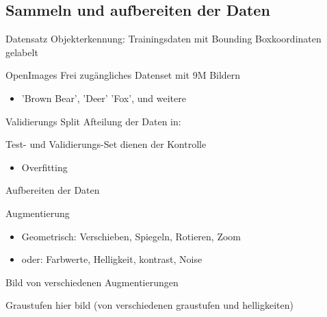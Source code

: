 \subsection[\thesection .\thesubsection \ 
Sammeln und aufbereiten der Daten]{Sammeln und aufbereiten der Daten}\label{subsec:collect_data}
\begin{frame}{Datensatz}
    Objekterkennung: Trainingsdaten mit Bounding Boxkoordinaten gelabelt
    \begin{block}{OpenImages}
        Frei zugängliches Datenset mit 9M Bildern
        \begin{itemize}
            \item 'Brown Bear', 'Deer' 'Fox', und weitere
        \end{itemize}
    \end{block}

    \begin{block}{Validierungs Split}
        Afteilung der Daten in:
        \begin{figure}[h]
            \centering
            \def\svgwidth{0.8\columnwidth}
            
        \end{figure}
        Test- und Validierungs-Set dienen der Kontrolle\\
        \begin{itemize}
            \item Overfitting
        \end{itemize}
    \end{block}
\end{frame}

\begin{frame}{Aufbereiten der Daten}
    \begin{block}{Augmentierung}
        \begin{itemize}
            \item Geometrisch: Verschieben, Spiegeln, Rotieren, Zoom
            \item oder: Farbwerte, Helligkeit, kontrast, Noise
        \end{itemize}
        Bild von verschiedenen Augmentierungen
    \end{block}
    \begin{block}{Graustufen}
        hier bild (von verschiedenen graustufen und helligkeiten)
    \end{block}
\end{frame}


